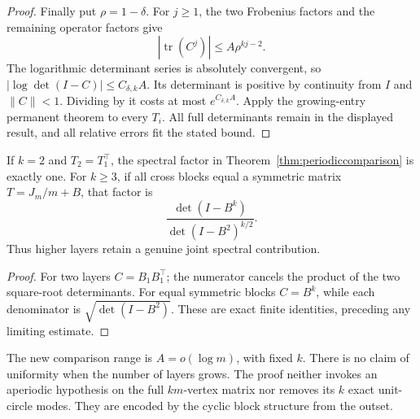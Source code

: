 \begin{proof}
Finally put \(\rho=1-\delta\).
For \(j\geq1\), the two Frobenius factors and the remaining
operator factors give
\[
 |\operatorname{tr}(C^j)|\leq A\rho^{kj-2}.
\]
The logarithmic determinant series is absolutely convergent,
so \(|\log\det(I-C)|\leq C_{\delta,k}A\).
Its determinant is positive by continuity from \(I\) and
\(\|C\|<1\). Dividing by it costs at most \(e^{C_{\delta,k}A}\).
Apply the growing-entry permanent theorem to every \(T_i\).
All full determinants remain in the displayed result,
and all relative errors fit the stated bound.
\end{proof}

\begin{corollary}
\label{cor:twolayersspecial}
If \(k=2\) and \(T_2=T_1^\top\), the spectral factor in
Theorem~\ref{thm:periodiccomparison} is exactly one.
For \(k\geq3\), if all cross blocks equal a symmetric matrix
\(T=J_m/m+B\), that factor is
\[
 \frac{\det(I-B^k)}{\det(I-B^2)^{k/2}}.
\]
Thus higher layers retain a genuine joint spectral contribution.
\end{corollary}
\begin{proof}
For two layers \(C=B_1B_1^\top\); the numerator cancels
the product of the two square-root determinants.
For equal symmetric blocks \(C=B^k\), while each denominator
is \(\sqrt{\det(I-B^2)}\).
These are exact finite identities, preceding any limiting estimate.
\end{proof}

\begin{remark}
The new comparison range is \(A=o(\log m)\), with fixed \(k\).
There is no claim of uniformity when the number of layers grows.
The proof neither invokes an aperiodic hypothesis on the full
\(km\)-vertex matrix nor removes its \(k\) exact unit-circle modes.
They are encoded by the cyclic block structure from the outset.
\end{remark}
